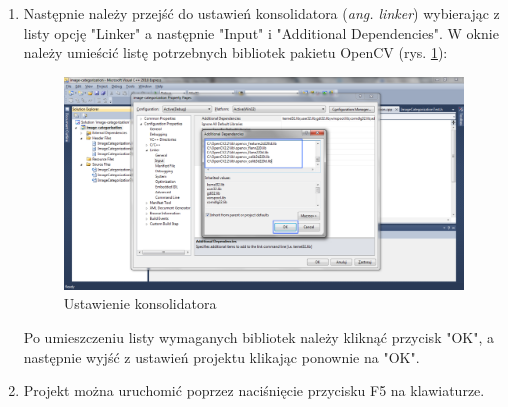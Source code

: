 \begin{enumerate}
	\item Następnie należy przejść do ustawień konsolidatora (\emph{ang. linker}) wybierając z listy opcję "Linker" a następnie "Input" i "Additional Dependencies". W oknie należy umieścić listę potrzebnych bibliotek pakietu OpenCV (rys. \ref{fig:ustawienia-linker}):
	
		
		\begin{figure}[h]
			\centering
			\includegraphics[scale=0.4]{graphics/03_implementacja/ustawienia-linker.pdf}
			\caption{ Ustawienie konsolidatora }
			\label{fig:ustawienia-linker}
		\end{figure}
	
	Po umieszczeniu listy wymaganych bibliotek należy kliknąć przycisk "OK", a następnie wyjść z ustawień projektu klikając ponownie na "OK".
	
	\item Projekt można uruchomić poprzez naciśnięcie przycisku F5 na klawiaturze.
\end{enumerate}

